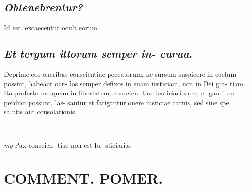 \documentclass{article}
\begin{document}
\begin{pages}
\subsection*{\textit{Obtenebrentur? }}\pstart Id est, excaecentur ocult eorum.  \pend
{}
{}
\subsection*{\textit{Et tergum illorum semper in- curua. }}\pstart Deprime eos oneribus conscientiae peccatorum, ne sursum suspicere in coelum possint, habeant ocu- los semper defixos in suam iusticiam, non in Dei gra- tiam. Ita profecto nunquam in libertatem, conscien- tiae iusticiariorum, et gaudium perduci possunt, las- santur et fatigantur onere iusticiae carnis, sed sine spe salutis aut consolationis.   \pend
\vspace{0.5cm}\noindent
\vspace{0.2cm}\rule{1cm}{0.2pt}\\ 
\hspace{0.2cm}\textit{mg}
\footnotesize Pax conscien- tiae non est Iu- sticiariis.  
\normalsize| 
\section*{COMMENT. POMER.  }
{}

\end{pages}
\end{document}
